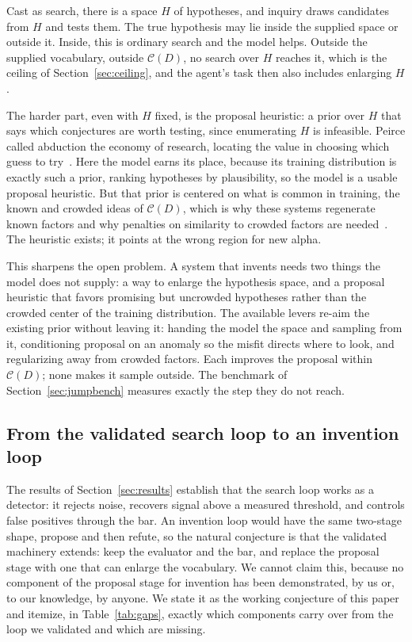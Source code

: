 \documentclass[11pt]{article}
\begin{document}
Cast as search, there is a space $H$ of hypotheses, and inquiry draws candidates from $H$ and tests
them. The true hypothesis may lie inside the supplied space or outside it. Inside, this is ordinary
search and the model helps. Outside the supplied vocabulary, outside $\mathcal{C}(D)$, no search over
$H$ reaches it, which is the ceiling of Section~\ref{sec:ceiling}, and the agent's task then also
includes enlarging $H$.

The harder part, even with $H$ fixed, is the proposal heuristic: a prior over $H$ that says which
conjectures are worth testing, since enumerating $H$ is infeasible. Peirce called abduction the economy
of research, locating the value in choosing which guess to try~\cite{peirce}. Here the model earns its
place, because its training distribution is exactly such a prior, ranking hypotheses by plausibility, so
the model is a usable proposal heuristic. But that prior is centered on what is common in training, the
known and crowded ideas of $\mathcal{C}(D)$, which is why these systems regenerate known factors and why
penalties on similarity to crowded factors are needed~\cite{alphaagent}. The heuristic exists; it points
at the wrong region for new alpha.

This sharpens the open problem. A system that invents needs two things the model does not supply: a way
to enlarge the hypothesis space, and a proposal heuristic that favors promising but uncrowded hypotheses
rather than the crowded center of the training distribution. The available levers re-aim the existing
prior without leaving it: handing the model the space and sampling from it, conditioning proposal on an
anomaly so the misfit directs where to look, and regularizing away from crowded factors. Each improves
the proposal within $\mathcal{C}(D)$; none makes it sample outside. The benchmark of
Section~\ref{sec:jumpbench} measures exactly the step they do not reach.

\subsection{From the validated search loop to an invention loop}
\label{sec:looptoinvention}

The results of Section~\ref{sec:results} establish that the search loop works as a detector: it rejects
noise, recovers signal above a measured threshold, and controls false positives through the bar. An
invention loop would have the same two-stage shape, propose and then refute, so the natural conjecture
is that the validated machinery extends: keep the evaluator and the bar, and replace the proposal stage
with one that can enlarge the vocabulary. We cannot claim this, because no component of the proposal
stage for invention has been demonstrated, by us or, to our knowledge, by anyone. We state it as the
working conjecture of this paper and itemize, in Table~\ref{tab:gaps}, exactly which components carry
over from the loop we validated and which are missing.
\end{document}
